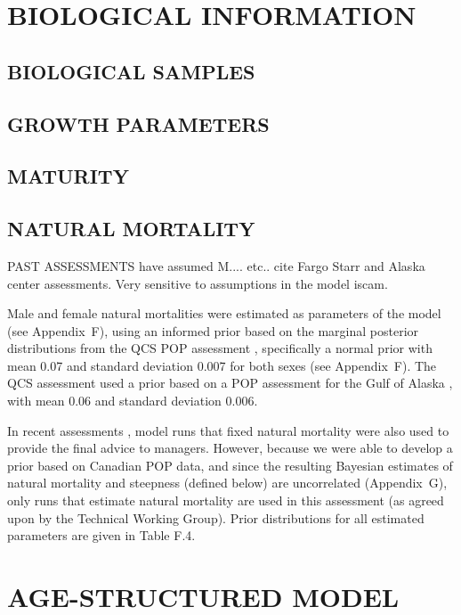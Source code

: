 \clearpage

\section{BIOLOGICAL INFORMATION}

\subsection{BIOLOGICAL SAMPLES}

\subsection{GROWTH PARAMETERS}

\subsection{MATURITY}

\subsection{NATURAL MORTALITY}

PAST ASSESSMENTS have assumed M.... etc.. cite Fargo Starr and Alaska center assessments. Very sensitive to assumptions in the model iscam.

Male and female natural mortalities were estimated as parameters of the model (see Appendix~F), using an informed prior based on the marginal posterior distributions from the QCS POP assessment , specifically a normal prior with mean 0.07 and standard deviation 0.007 for both sexes (see Appendix~F). The QCS assessment used a prior based on a POP assessment for the Gulf of Alaska , with mean 0.06 and standard deviation 0.006.

In recent assessments , model runs that fixed natural mortality were also used to provide the final advice to managers. However, because we were able to develop a prior based on Canadian POP data, and since the resulting Bayesian estimates of natural mortality and steepness (defined below) are uncorrelated (Appendix~G), only runs that estimate natural mortality are used in this assessment (as agreed upon by the Technical Working Group). Prior distributions for all estimated parameters are given in Table F.4.

\section{AGE-STRUCTURED MODEL}

